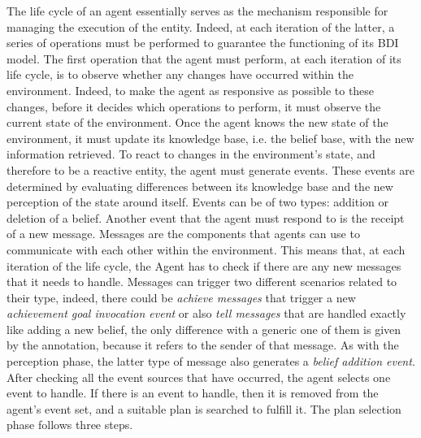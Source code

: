The life cycle of an agent essentially serves as the mechanism responsible for managing the execution of the entity. Indeed, at each iteration of the latter, a series of operations must be performed to guarantee the functioning of its BDI model. The first operation that the agent must perform, at each iteration of its life cycle, is to observe whether any changes have occurred within the environment. Indeed, to make the agent as responsive as possible to these changes, before it decides which operations to perform, it must observe the current state of the environment. Once the agent knows the new state of the environment, it must update its knowledge base, i.e. the belief base, with the new information retrieved. To react to changes in the environment's state, and therefore to be a reactive entity, the agent must generate events. These events are determined by evaluating differences between its knowledge base and the new perception of the state around itself. Events can be of two types: addition or deletion of a belief. Another event that the agent must respond to is the receipt of a new message. Messages are the components that agents can use to communicate with each other within the environment. This means that, at each iteration of the life cycle, the Agent has to check if there are any new messages that it needs to handle. Messages can trigger two different scenarios related to their type, indeed, there could be \textit{achieve messages} that trigger a new \textit{achievement goal invocation event} or also \textit{tell messages} that are handled exactly like adding a new belief, the only difference with a generic one of them is given by the annotation, because it refers to the sender of that message. As with the perception phase, the latter type of message also generates a \textit{belief addition event}. After checking all the event sources that have occurred, the agent selects one event to handle. If there is an event to handle, then it is removed from the agent's event set, and a suitable plan is searched to fulfill it. The plan selection phase follows three steps.

